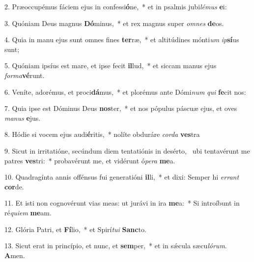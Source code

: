 2. Præoccupémus fáciem ejus in confessi\textbf{ó}ne,~*  et in psalmis jubi\textit{lé}\textit{mus} \textbf{e}i:\

3. Quóniam Deus magnus \textbf{Dó}minus,~*  et rex magnus super \textit{om}\textit{nes} \textbf{de}os.\

4. Quia in manu ejus sunt omnes fines \textbf{ter}ræ,~*  et altitúdines mónti\textit{um} \textit{ip}\textbf{sí}us sunt;\

5. Quóniam ipsíus est mare, et ipse fecit \textbf{il}lud,~*  et siccam manus ejus \textit{for}\textit{ma}\textbf{vé}runt.\

6. Veníte, adorémus, et proci\textbf{dá}mus,~*  et plorémus ante Dómi\textit{num} \textit{qui} \textbf{fe}cit nos:\

7. Quia ipse est Dóminus Deus \textbf{nos}ter,~*  et nos pópulus páscuæ ejus, et oves \textit{ma}\textit{nus} \textbf{e}jus.\

8. Hódie si vocem ejus audi\textbf{é}ritis,~*  nolíte obduráre \textit{cor}\textit{da} \textbf{ves}tra\

9. Sicut in irritatióne, secúndum diem tentatiónis in desérto, \dag\  ubi tentavérunt me patres \textbf{ves}tri:~*  probavérunt me, et vidérunt ó\textit{pe}\textit{ra} \textbf{me}a.\

10. Quadragínta annis offénsus fui generatióni \textbf{il}li,~*  et dixi: Semper hi \textit{er}\textit{rant} \textbf{cor}de.\

11. Et isti non cognovérunt vias meas: ut jurávi in ira \textbf{me}a:~*  Si introíbunt in ré\textit{qui}\textit{em} \textbf{me}am.\

12. Glória Patri, et \textbf{Fí}lio,~*  et Spirí\textit{tu}\textit{i} \textbf{Sanc}to.\

13. Sicut erat in princípio, et nunc, et \textbf{sem}per,~*  et in sǽcula sæcu\textit{ló}\textit{rum}. \textbf{A}men.\

